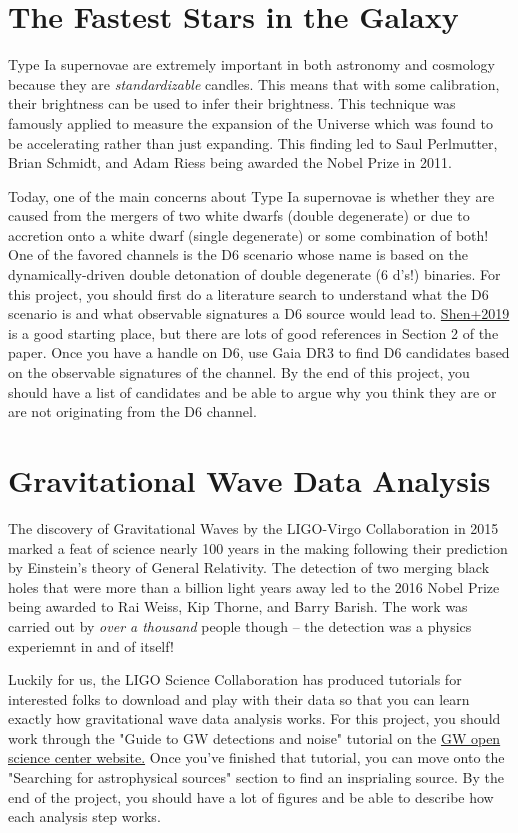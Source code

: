 \documentclass[10pt]{extarticle}
\begin{document}
\section{The Fastest Stars in the Galaxy}
Type Ia supernovae are extremely important in both astronomy and cosmology
because they are \emph{standardizable} candles. This means that with some
calibration, their brightness can be used to infer their brightness. This
technique was famously applied to measure the expansion of the Universe which
was found to be accelerating rather than just expanding. This finding led to
Saul Perlmutter, Brian Schmidt, and Adam Riess being awarded the Nobel Prize in
2011. 

Today, one of the main concerns about Type Ia supernovae is whether they are
caused from the mergers of two white dwarfs (double degenerate) or due to
accretion onto a white dwarf (single degenerate) or some combination of both!
One of the favored channels is the D6 scenario whose name is based on the
dynamically-driven double detonation of double degenerate (6 d's!) binaries. For
this project, you should first do a literature search to understand what the D6
scenario is and what observable signatures a D6 source would lead to.
\href{https://ui.adsabs.harvard.edu/abs/2018ApJ...865...15S/abstract}{Shen+2019}
is a good starting place, but there are lots of good references in Section 2 of
the paper. Once you have a handle on D6, use Gaia DR3 to find D6 candidates
based on the observable signatures of the channel. By the end of this project,
you should have a list of candidates and be able to argue why you think they are
or are not originating from the D6 channel. 

\section{Gravitational Wave Data Analysis}
The discovery of Gravitational Waves by the LIGO-Virgo Collaboration in 2015
marked a feat of science nearly 100 years in the making following their
prediction by Einstein's theory of General Relativity. The detection of two
merging black holes that were more than a billion light years away led to the
2016 Nobel Prize being awarded to Rai Weiss, Kip Thorne, and Barry Barish. The
work was carried out by \emph{over a thousand} people though -- the detection
was a physics experiemnt in and of itself!

Luckily for us, the LIGO Science Collaboration has produced tutorials for
interested folks to download and play with their data so that you can learn
exactly how gravitational wave data analysis works. For this project, you should
work through the "Guide to GW detections and noise" tutorial on the
\href{https://gwosc.org/tutorials/}{GW open science center website.}  Once
you've finished that tutorial, you can move onto the "Searching for
astrophysical sources" section to find an insprialing source. By the end of the
project, you should have a lot of figures and be able to describe how each
analysis step works.
\end{document}
